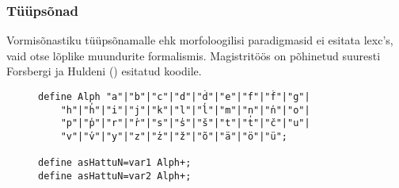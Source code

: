 \documentclass[12pt,a4paper]{article}
\begin{document}
\subsubsection{Tüüpsõnad}
\label{sec:giella-tüüpsõnad}

Vormisõnastiku tüüpsõnamalle ehk morfoloogilisi paradigmasid ei esitata lexc's, vaid otse lõplike muundurite formalismis. Magistritöös on põhinetud suuresti Forsbergi ja Huldeni (\citeyear{forsberg_learning_2016}) esitatud koodile.

\begin{figure}[H]
  \center
  \begin{verbatim}
define Alph "a"|"b"|"c"|"d"|"d̕"|"e"|"f"|"f̕"|"g"|
    "h"|"h̕"|"i"|"j"|"k"|"l"|"l̕"|"m"|"n"|"n̕"|"o"|
    "p"|"p̕"|"r"|"r̕"|"s"|"s̕"|"š"|"t"|"t̕"|"č"|"u"|
    "v"|"v̕"|"y"|"z"|"z̕"|"ž"|"õ"|"ä"|"ö"|"ü";

define asHattuN=var1 Alph+;
define asHattuN=var2 Alph+;


\end{verbatim}
\end{figure}
\end{document}
